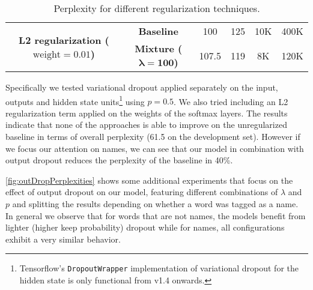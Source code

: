 \begin{table}[H]
{\begin{tabular}{cc|c|c|c|c|}
		\multicolumn{1}{|c|}{\multirow{2}{*}{\textbf{L2 regularization ($\text{weight}\mathbf{=0.01}$)}}} & \textbf{Baseline}                & 100         & 125        & 10K          & 400K        \\ \cline{2-6} 
		\multicolumn{1}{|c|}{}                                                  & \textbf{Mixture ($\boldsymbol{\lambda}\mathbf{=100}$)} & 107.5       & 119        & 8K         & 120K        \\ \hline
	\end{tabular}}
	\caption{Perplexity for different regularization techniques.}
	\label{smmExps}
\end{table}

Specifically we tested variational dropout applied separately on the input, outputs and hidden state units\footnote{Tensorflow's \texttt{DropoutWrapper} implementation of variational dropout for the hidden state is only functional from v1.4 onwards.} using $p=0.5$. We also tried including an L2 regularization term applied on the weights of the softmax layers. The results indicate that none of the approaches is able to improve on the unregularized baseline in terms of overall perplexity (61.5 on the development set). However if we focus our attention on names, we can see that our model in combination with output dropout reduces the perplexity of the baseline in 40\%.

\autoref{fig:outDropPerplexities} shows some additional experiments that focus on the effect of output dropout on our model, featuring different combinations of $\lambda$ and $p$ and splitting the results depending on whether a word was tagged as a name. In general we observe that for words that are not names, the models benefit from lighter (higher keep probability) dropout while for names, all configurations exhibit a very similar behavior.

\begin{figure}[H]
	\centering
	\label{fig:outDropPerplexities}
\end{figure}

